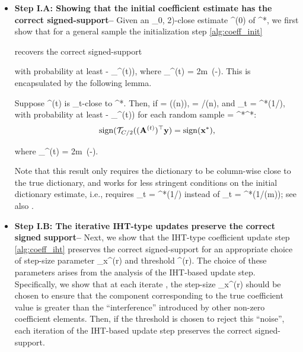 \documentclass{article}
\newcommand{\sgn}{{\rm sign}}
\newcommand{\HT}{{\c{T}}}
\def\[#1\]{{$#1$}}
\def\b#1{{\mathbf{#1}}}
\def\c#1{{\mathcal{#1}}}
\begin{document}
\begin{itemize}
\item\textbf{Step I.A: Showing that the initial coefficient estimate has the correct signed-support--} \label{Step I.A}
Given an \[(\epsilon_0, 2)\]-close estimate \[\b{A}^{(0)}\] of \[\b{A}^*\], we first show that for a general sample \[\b{y}\] the initialization step \eqref{alg:coeff_init}





recovers the correct signed-support 




with probability at least \[(1 - \delta_{\HT}^{(t)})\], where \[\delta_{\HT}^{(t)} = 2m~{\exp}({-})\]. This is encapsulated by the following lemma. 










\begin{lemma} \label{lem:recover_sign}
	Suppose \[\b{A}^{(t)}\] is \[\epsilon_t\]-close to \[\b{A}^*\]. Then, if \[\mu = \c{O}(\log(n))\], \[k = /\mu\log(n)\], and \[\epsilon_t = ^*(1/)\], with probability at least \[(1 - \delta_{\HT}^{(t)})\] for each random sample \[\b{y} = \b{A}^*\b{x}^*\]:
	\begin{align*}
	\sgn(\HT_{C/2}((\b{A}^{(t)})^\top \b{y}) = \sgn(\b{x}^*),
	\end{align*}
	
	where \[\delta_{\HT}^{(t)} = 2m~{\exp}({-})\].
\end{lemma}








Note that this result only requires the dictionary to be column-wise close to the true dictionary, and works for less stringent conditions on the initial dictionary estimate, i.e., requires \[\epsilon_t = ^*(1/)\] instead of \[\epsilon_t = ^*(1/\log(m))\]; see also \citep{Arora15}.

 

\item\textbf{Step I.B: The iterative IHT-type updates preserve the correct signed support--}\label{Step I.B} Next, we show that the IHT-type coefficient update step \eqref{alg:coeff_iht} preserves the correct signed-support for an appropriate choice of step-size parameter \[\eta_x^{(r)}\] and threshold \[\tau^{(r)}\]. The choice of these parameters arises from the analysis of the  IHT-based update step. Specifically, we show that at each iterate \[r\], the step-size \[\eta_x^{(r)}\] should be chosen to ensure that the component corresponding to the true coefficient value is greater than the ``interference'' introduced by other non-zero coefficient elements. Then, if the threshold is chosen to reject this ``noise'', each iteration of the IHT-based update step preserves the correct signed-support.





\end{itemize}
\end{document}
